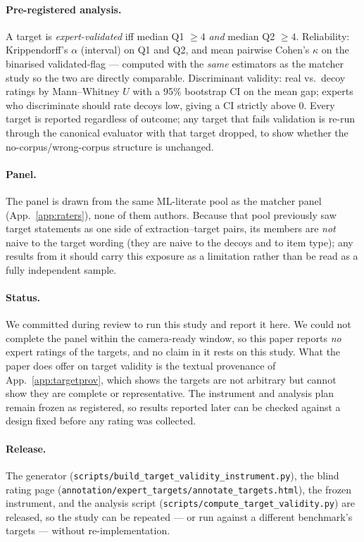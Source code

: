 \documentclass[11pt]{article}
\newcommand{\fpath}[1]{\mbox{}\nolinkurl{#1}}
\begin{document}
\paragraph{Pre-registered analysis.} A target is \emph{expert-validated} iff median Q1 $\geq 4$
\emph{and} median Q2 $\geq 4$. Reliability: Krippendorff's $\alpha$ (interval) on Q1 and Q2, and
mean pairwise Cohen's $\kappa$ on the binarised validated-flag --- computed with the \emph{same}
estimators as the matcher study so the two are directly comparable. Discriminant validity:
real vs.\ decoy ratings by Mann--Whitney $U$ with a 95\% bootstrap CI on the mean gap; experts
who discriminate should rate decoys low, giving a CI strictly above 0. Every target is reported
regardless of outcome; any target that fails validation is re-run through the canonical evaluator
with that target dropped, to show whether the no-corpus/wrong-corpus structure is unchanged.

\paragraph{Panel.} The panel is drawn from the same ML-literate pool as the matcher panel
(App.~\ref{app:raters}), none of them authors. Because that pool previously saw target
statements as one side of extraction--target pairs, its members are \emph{not} naive to the
target wording (they are naive to the decoys and to item type); any results from it should carry
this exposure as a limitation rather than be read as a fully independent sample.

\paragraph{Status.} We committed during review to run this study and report it here. We could
not complete the panel within the camera-ready window, so this paper reports \emph{no} expert
ratings of the targets, and no claim in it rests on this study. What the paper does offer on target
validity is the textual provenance of App.~\ref{app:targetprov}, which shows the targets are not
arbitrary but cannot show they are complete or representative. The instrument and analysis plan
remain frozen as registered, so results reported later can be checked against a design fixed before
any rating was collected.

\paragraph{Release.} The generator (\fpath{scripts/build_target_validity_instrument.py}), the
blind rating page (\fpath{annotation/expert_targets/annotate_targets.html}), the frozen
instrument, and the analysis script (\fpath{scripts/compute_target_validity.py}) are released, so
the study can be repeated --- or run against a different benchmark's targets --- without
re-implementation.
\end{document}
